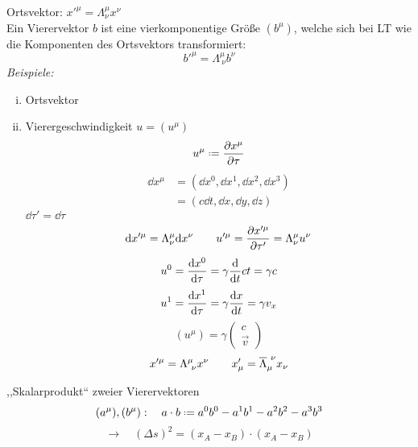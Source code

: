 Ortsvektor: $ x'^{\mu} = \Lambda^{\mu}_{\nu} x^{\nu} $\\[5pt]
Ein Vierervektor $ b $ ist eine vierkomponentige Größe $ (b^{\mu}) $, welche sich bei LT wie die Komponenten des Ortsvektors transformiert:
\begin{equation*}
b'^{\mu} = \Lambda^{\mu}_{\ \nu} b^{\nu}
\end{equation*}
\emph{Beispiele:}
\begin{enumerate}[i)]
	\item Ortsvektor
	\item Vierergeschwindigkeit $ u = (u^{\mu}) $\\
	\begin{equation*}
	u^{\mu} \defeq \prt{x^{\mu}}{\tau}
	\end{equation*}
	\begin{align*}
	\dd x^{\mu} &= (\dd x^0, \dd x^1, \dd x^2, \dd x^3)\\
	&= (c \dd t, \dd x, \dd y, \dd z)
	\end{align*}
	$ \dd \tau' = \dd \tau $
	\begin{equation*}
	\textrm{d} x'^{\mu} = \Lambda^{\mu}_{\nu} \textrm{d} x^{\nu} \qquad u'^{\mu} = \frac{\partial x'^{\mu}}{\partial \tau'} = \Lambda^{\mu}_{\nu} u^{\nu}
	\end{equation*}
	\begin{equation*}
	u^{0} = \frac{\textrm{d} x^{0}}{\textrm{d} \tau} = \gamma \frac{\textrm{d} }{\textrm{d} t} ct = \gamma c
	\end{equation*}
	\begin{equation*}
	u^{1} = \frac{\textrm{d} x^1}{\textrm{d} \tau} = \gamma \frac{\textrm{d} x}{\textrm{d} t} = \gamma v_x
	\end{equation*}
	\begin{equation*}
	(u^{\mu}) = \gamma \begin{pmatrix}
	c \\ \vec{v}
	\end{pmatrix}
	\end{equation*}
	\begin{equation*}
	x'^{\mu} = \Lambda^{\mu}_{\ \nu} x^{\nu} \qquad x'_{\mu} = \overline{\Lambda}_{\mu}^{\ \nu} x_\nu 
	\end{equation*}
\end{enumerate}
,,Skalarprodukt`` zweier Vierervektoren
\begin{equation*}
(a^{\mu}), (b^{\mu}) : \quad a \cdot b \defeq a^0 b^0 - a^1 b^1 - a^2 b^2 - a^3 b^3
\end{equation*}
\begin{equation*}
\rightarrow \quad (\Delta s)^2 = (x_A - x_B) \cdot (x_A - x_B)
\end{equation*}


